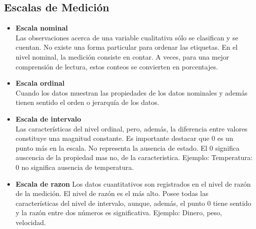 \documentclass{article}
\begin{document}
    \subsection{Escalas de Medición}
    \begin{itemize}
        \item \textbf{Escala nominal}\\
        	Las observaciones acerca de una variable cualitativa sólo se clasifican y se cuentan.  No existe una forma particular para ordenar las etiquetas. En el nivel nominal, la medición consiste en contar. A veces, para una mejor comprensión de lectura, estos conteos se convierten en porcentajes.
        \item\textbf{Escala ordinal}\\
        Cuando los datos muestran las propiedades de los datos nominales y además tienen sentido el orden o jerarquía de los datos.
        
        \item \textbf{Escala de intervalo}\\
        Las características del nivel ordinal, pero, además, la diferencia entre valores constituye una magnitud constante. Es importante destacar que 0 es un punto más en la escala. No representa la ausencia de estado.  El 0 significa auscencia de la propiedad mas no, de la caracteristica. Ejemplo: Temperatura: 0 no signiﬁca ausencia de temperatura.
        
        \item \textbf{Escala de razon}
        	Los datos cuantitativos son registrados en el nivel de razón de la medición. El nivel de razón es el más alto. Posee todas las características del nivel de intervalo, aunque, además, el punto 0 tiene sentido y la razón entre dos  números es significativa. Ejemplo: Dinero, peso, velocidad.
    \end{itemize}
    
   
\end{document}
